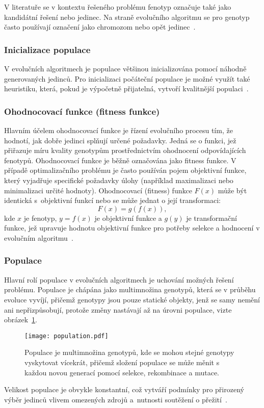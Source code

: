 V literatuře se v kontextu řešeného problému fenotyp označuje také jako kandidátní řešení nebo jedinec. 
Na straně evolučního algoritmu se pro genotyp často používají označení jako chromozom nebo opět jedinec~\cite{IntroductionToEvoComputing}.

\subsubsection*{Inicializace populace}
V evolučních algoritmech je populace většinou inicializována pomocí náhodně generovaných jedinců. 
Pro inicializaci počáteční populace je možné využít také heuristiku, která, pokud je výpočetně přijatelná, vytvoří kvalitnější populaci~\cite{IntroductionToEvoComputing}. 

\subsubsection*{Ohodnocovací funkce (fitness funkce)}
Hlavním účelem ohodnocovací funkce je řízení evolučního procesu tím, že hodnotí, jak dobře jedinci splňují určené požadavky. 
Jedná se o funkci, jež přiřazuje míru kvality genotypům prostřednictvím ohodnocení odpovídajících fenotypů. 
Ohodnocovací funkce je běžně označována jako fitness funkce. 
V případě optimalizačního problému je často používán pojem objektivní funkce, který vyjadřuje specifické požadavky úlohy (například maximalizaci nebo minimalizaci určité hodnoty).
Ohodnocovací (fitness) funkce $F\left(x\right)$ může být identická s~objektivní funkcí nebo se může jednat o její transformaci:
\begin{equation*}
    F\left( x \right) = g\left( f \left( x \right)\right),
\end{equation*}
kde $x$ je fenotyp, $y=f\left(x\right)$ je objektivní funkce a $g\left(y\right)$ je transformační funkce, jež upravuje hodnotu objektivní funkce pro potřeby selekce a hodnocení v evolučním algoritmu~\cite{IntroductionToEvoComputing,NaturalComputing}. 

\subsubsection*{Populace}
Hlavní rolí populace v evolučních algoritmech je uchování možných řešení problému. 
Populace je chápána jako multimnožina genotypů, která se v průběhu evoluce vyvíjí, přičemž genotypy jsou pouze statické objekty, jenž se samy nemění ani nepřizpůsobují, protože změny nastávají až na úrovni populace, vizte obrázek~\ref{fig:population}. 
\begin{figure}[ht!]
    \centering
    \texttt{[image: population.pdf]}
    \caption{Populace je multimnožina genotypů, kde se mohou stejné genotypy vyskytovat vícekrát, přičemž složení populace se může měnit s každou novou generací pomocí selekce, rekombinace a mutace.}
    \label{fig:population}
\end{figure}
Velikost populace je obvykle konstantní, což vytváří podmínky pro přirozený výběr jedinců vlivem omezených zdrojů a~nutnosti soutěžení o přežití~\cite{IntroductionToEvoComputing}. 


